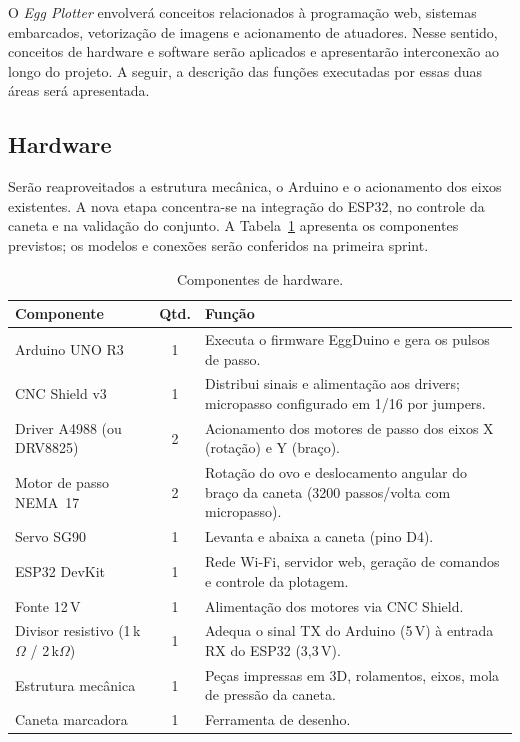 \documentclass[10pt,a4paper]{article}
\begin{document}
O \textit{Egg Plotter} envolverá conceitos relacionados à programação web, sistemas embarcados, vetorização de imagens e acionamento de atuadores. Nesse sentido, conceitos de hardware e software serão aplicados e apresentarão interconexão ao longo do projeto. A seguir, a descrição das funções executadas por essas duas áreas será apresentada.

\subsection{Hardware}

Serão reaproveitados a estrutura mecânica, o Arduino e o acionamento dos
eixos existentes. A nova etapa concentra-se na integração do ESP32, no
controle da caneta e na validação do conjunto. A Tabela~\ref{tab:hardware}
apresenta os componentes previstos; os modelos e conexões serão conferidos
na primeira sprint.





\begin{table}[htbp]
\centering
\caption{Componentes de hardware.}
\label{tab:hardware}
\small
\begin{tabularx}{\linewidth}{@{}l c X@{}}
\toprule
\textbf{Componente} & \textbf{Qtd.} & \textbf{Função} \\
\midrule
Arduino UNO R3 & 1 & Executa o firmware EggDuino e gera os pulsos de passo. \\
CNC Shield v3 & 1 & Distribui sinais e alimentação aos drivers; micropasso configurado em 1/16 por jumpers. \\
Driver A4988 (ou DRV8825) & 2 & Acionamento dos motores de passo dos eixos X (rotação) e Y (braço). \\
Motor de passo NEMA~17 & 2 & Rotação do ovo e deslocamento angular do braço da caneta (3200 passos/volta com micropasso). \\
Servo SG90 & 1 & Levanta e abaixa a caneta (pino D4). \\
ESP32 DevKit & 1 & Rede Wi-Fi, servidor web, geração de comandos e controle da plotagem. \\
Fonte 12\,V & 1 & Alimentação dos motores via CNC Shield. \\
Divisor resistivo (1\,k$\Omega$ / 2\,k$\Omega$) & 1 & Adequa o sinal TX do Arduino (5\,V) à entrada RX do ESP32 (3,3\,V). \\
Estrutura mecânica & 1 & Peças impressas em 3D, rolamentos, eixos, mola de pressão da caneta. \\
Caneta marcadora & 1 & Ferramenta de desenho. \\
\bottomrule
\end{tabularx}
\end{table}
\end{document}
